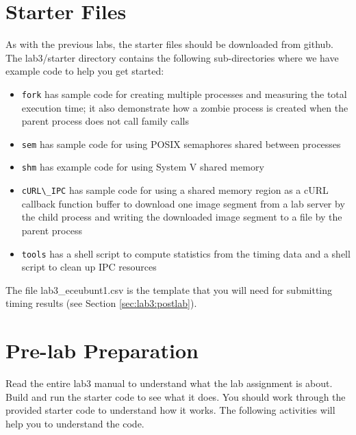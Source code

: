 \section{Starter Files}
As with the previous labs, the starter files should be downloaded from github. The lab3/starter directory contains the following sub-directories where we have example code to help you get started:
\begin{itemize}
\item \verb+fork+ has sample code for creating multiple processes and measuring the total execution time;
  it also demonstrate how a zombie process is created when the parent process does not call  family calls
\item \verb+sem+ has sample code for using POSIX semaphores shared between processes
\item \verb+shm+ has example code for using System V shared memory
\item \verb+cURL\_IPC+ has sample code for using a shared memory region as a cURL callback function buffer to download one image segment from a lab server by the child process and writing the downloaded image segment to a file by the parent process
\item \verb+tools+ has a shell script to compute statistics from the timing data and a shell script to clean up IPC resources
\end{itemize}
The file lab3\_eceubunt1.csv is the template that you will need for submitting timing results (see Section \ref{sec:lab3:postlab}).
\section{Pre-lab Preparation}
Read the entire lab3 manual to understand what the lab assignment is about. Build and run the starter code to see what it does. You should work through the provided starter code to understand how it works. The following activities will help you to understand the code.

